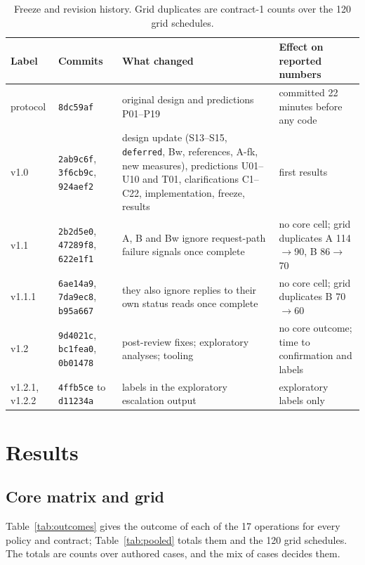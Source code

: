 \documentclass[11pt]{article}
\newcommand{\code}[1]{\texttt{#1}}
\begin{document}
\begin{table}[!htbp]
\centering
\footnotesize
\caption{Freeze and revision history. Grid duplicates are contract-1 counts over the 120 grid schedules.}
\label{tab:history}
\begin{tabular}{@{}lL{3.0cm}L{5.6cm}L{4.6cm}@{}}
\toprule
Label & Commits & What changed & Effect on reported numbers \\
\midrule
protocol & \code{8dc59af} & original design and predictions P01--P19 & committed 22 minutes before any code \\
v1.0 & \code{2ab9c6f}, \code{3f6cb9c}, \code{924aef2} & design update (S13--S15, \code{deferred}, Bw, references, A-fk, new measures), predictions U01--U10 and T01, clarifications C1--C22, implementation, freeze, results & first results \\
v1.1 & \code{2b2d5e0}, \code{47289f8}, \code{622e1f1} & A, B and Bw ignore request-path failure signals once complete & no core cell; grid duplicates A 114$\to$90, B 86$\to$70 \\
v1.1.1 & \code{6ae14a9}, \code{7da9ec8}, \code{b95a667} & they also ignore replies to their own status reads once complete & no core cell; grid duplicates B 70$\to$60 \\
v1.2 & \code{9d4021c}, \code{bc1fea0}, \code{0b01478} & post-review fixes; exploratory analyses; tooling & no core outcome; time to confirmation and labels \\
v1.2.1, v1.2.2 & \code{4ffb5ce} to \code{d11234a} & labels in the exploratory escalation output & exploratory labels only \\
\bottomrule
\end{tabular}
\end{table}

\section{Results}\label{sec:results}

\subsection{Core matrix and grid}\label{sec:core}

Table~\ref{tab:outcomes} gives the outcome of each of the 17 operations for every policy and contract; Table~\ref{tab:pooled} totals them and the 120 grid schedules. The totals are counts over authored cases, and the mix of cases decides them.
\end{document}
